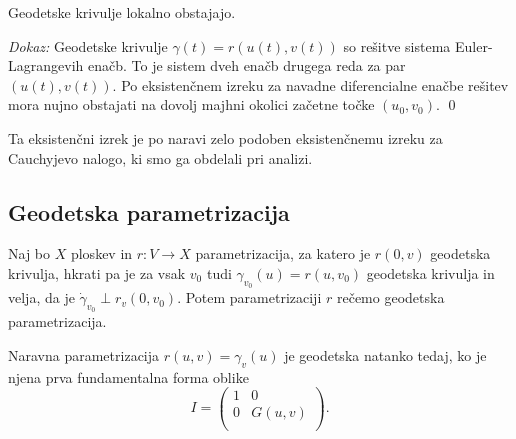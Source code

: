 \begin{trditev}
\label{trd_lokalni_obstoj_geodetk}
Geodetske krivulje lokalno obstajajo.
\end{trditev}

\noindent
{\em Dokaz:\/}
Geodetske krivulje $\gamma(t) = r(u(t), v(t))$ so rešitve sistema Euler-Lagrangevih enačb. To je sistem dveh enačb drugega reda za par $(u(t), v(t))$. Po 
eksistenčnem izreku za navadne diferencialne enačbe rešitev mora nujno obstajati na dovolj majhni okolici začetne točke $(u_0, v_0)$.
\qed

\begin{opomba}
Ta eksistenčni izrek je po naravi zelo podoben eksistenčnemu izreku za Cauchyjevo nalogo, ki smo ga obdelali pri analizi.
\end{opomba}

\subsection{Geodetska parametrizacija}

\begin{definicija}
\label{def_geodetska_parametrizacija}

Naj bo $X$ ploskev in $r: V \to  X$ parametrizacija, za katero je $r(0, v)$ geodetska krivulja, hkrati pa je za vsak
$v_0$ tudi $\gamma_{v_0}(u) = r(u, v_0)$ geodetska krivulja in velja, da je $\dot{\gamma}_{v_0} \perp r_v(0, v_0)$.
Potem parametrizaciji $r$ rečemo geodetska parametrizacija.  

\end{definicija}

\begin{trditev}
\label{trd_ekvivalentni_pogoj_za_geodetskost_parametrizacije}
Naravna parametrizacija $r(u,v) = \gamma_v(u)$ je geodetska natanko tedaj, ko je njena prva fundamentalna forma oblike \begin{equation*}
I = \begin{pmatrix}
    1 & 0\\
    0 & G(u,v)\\
\end{pmatrix}.
\end{equation*}  
\end{trditev}

